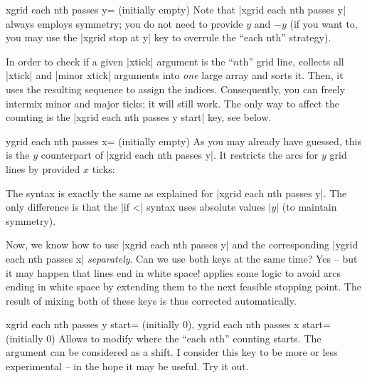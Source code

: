 \begin{pgfplotskey}{xgrid each nth passes y= (initially empty)}
    Note that |xgrid each nth passes y| always employs symmetry; you do not
    need to provide $y$ and $-y$ (if you want to, you may use the
    |xgrid stop at y| key to overrule the ``each nth'' strategy).

    In order to check if a given |xtick| argument is the ``$n$th'' grid line,
    \PGFPlots{} collects all |xtick| and |minor xtick| arguments into
    \emph{one} large array and sorts it. Then, it uses the resulting sequence
    to assign the indices. Consequently, you can freely intermix minor and
    major ticks; it will still work. The only way to affect the counting is the
    |xgrid each nth passes y start| key, see below.
\end{pgfplotskey}

\begin{pgfplotskey}{ygrid each nth passes x= (initially empty)}
    As you may already have guessed, this is the $y$ counterpart of
    |xgrid each nth passes y|. It restricts the arcs for $y$ grid lines by
    provided $x$ ticks:
\begin{codeexample}[]
\begin{tikzpicture}
\begin{smithchart}[
    xtick={0.2,0.5,1,2,5},
    ytick={
        0,
         0.2, 0.5, 1, 2, 5,
        -0.2,-0.5,-1,-2,-5
    },
    ygrid each nth passes x={0.2,1:2},
]
    \end{smithchart}
\end{tikzpicture}
\end{codeexample}
    The syntax is exactly the same as explained for |xgrid each nth passes y|.
    The only difference is that the |if <| syntax uses absolute values $|y|$
    (to maintain symmetry).
\end{pgfplotskey}

Now, we know how to use |xgrid each nth passes y| and the corresponding
|ygrid each nth passes x| \emph{separately}. Can we use both keys at the same
time? Yes -- but it may happen that lines end in white space! \PGFPlots{}
applies some logic to avoid arcs ending in white space by extending them to the
next feasible stopping point. The result of mixing both of these keys is thus
corrected automatically.

\begin{pgfplotskeylist}{%
    xgrid each nth passes y start= (initially 0),
    ygrid each nth passes x start= (initially 0)%
}
    Allows to modify where the ``each $n$th'' counting starts. The argument can
    be considered as a shift. I consider this key to be more or less
    experimental -- in the hope it may be useful. Try it out.
\end{pgfplotskeylist}


